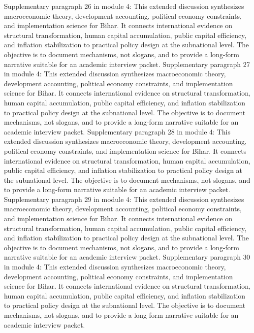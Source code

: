 \documentclass[preprint,12pt]{elsarticle}
\begin{document}
Supplementary paragraph 26 in module 4: This extended discussion synthesizes macroeconomic theory, development accounting, political economy constraints, and implementation science for Bihar. It connects international evidence on structural transformation, human capital accumulation, public capital efficiency, and inflation stabilization to practical policy design at the subnational level. The objective is to document mechanisms, not slogans, and to provide a long-form narrative suitable for an academic interview packet.
Supplementary paragraph 27 in module 4: This extended discussion synthesizes macroeconomic theory, development accounting, political economy constraints, and implementation science for Bihar. It connects international evidence on structural transformation, human capital accumulation, public capital efficiency, and inflation stabilization to practical policy design at the subnational level. The objective is to document mechanisms, not slogans, and to provide a long-form narrative suitable for an academic interview packet.
Supplementary paragraph 28 in module 4: This extended discussion synthesizes macroeconomic theory, development accounting, political economy constraints, and implementation science for Bihar. It connects international evidence on structural transformation, human capital accumulation, public capital efficiency, and inflation stabilization to practical policy design at the subnational level. The objective is to document mechanisms, not slogans, and to provide a long-form narrative suitable for an academic interview packet.
Supplementary paragraph 29 in module 4: This extended discussion synthesizes macroeconomic theory, development accounting, political economy constraints, and implementation science for Bihar. It connects international evidence on structural transformation, human capital accumulation, public capital efficiency, and inflation stabilization to practical policy design at the subnational level. The objective is to document mechanisms, not slogans, and to provide a long-form narrative suitable for an academic interview packet.
Supplementary paragraph 30 in module 4: This extended discussion synthesizes macroeconomic theory, development accounting, political economy constraints, and implementation science for Bihar. It connects international evidence on structural transformation, human capital accumulation, public capital efficiency, and inflation stabilization to practical policy design at the subnational level. The objective is to document mechanisms, not slogans, and to provide a long-form narrative suitable for an academic interview packet.
\end{document}
